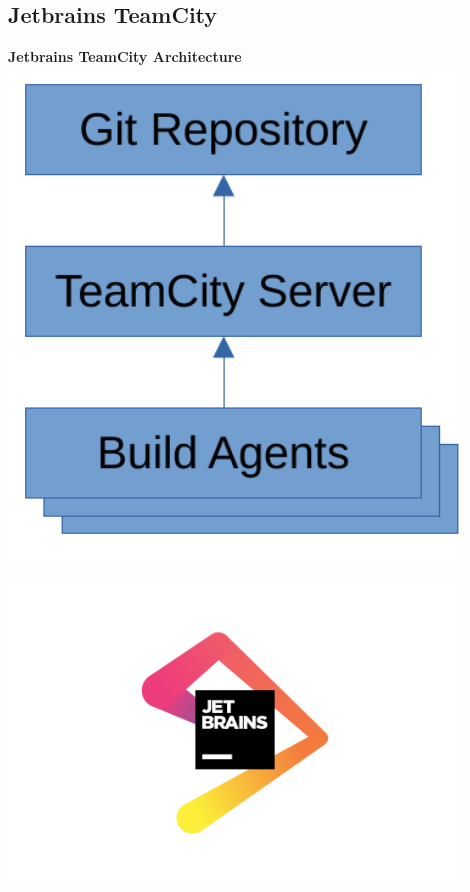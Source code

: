 \documentclass[english,xcolor=pst,11pt]{beamer}
\begin{document}
\begin{frame}

\section{Jetbrains TeamCity}
\begin{minipage}{0.45\textwidth}

\textbf{Jetbrains TeamCity Architecture}
        \centering
        \includegraphics[width=0.9\textwidth]{diagrams/teamcity.pdf} %
    \end{minipage}\hfill
    \begin{minipage}{0.45\textwidth}
        \centering
        \includegraphics[width=0.9\textwidth]{logos/jetbrains.pdf}

\end{minipage}
\end{frame}
\end{document}
